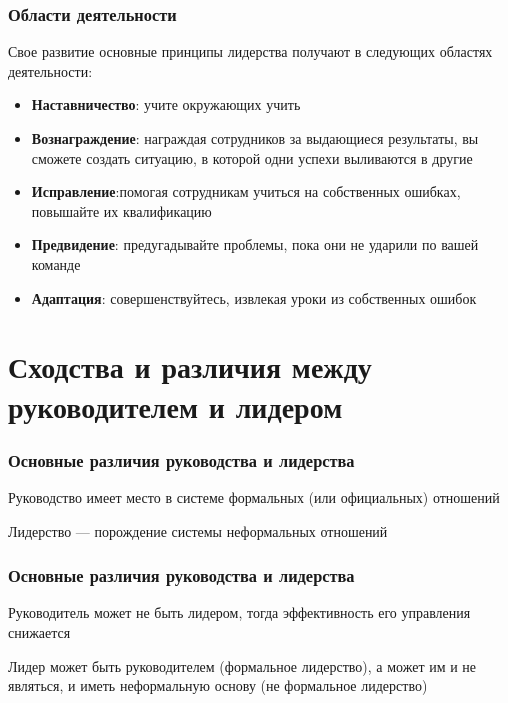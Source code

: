 \documentclass{../industrial-development}
\begin{document}
\begin{frame} \frametitle {Области деятельности}

Свое развитие основные принципы лидерства получают в следующих областях деятельности:

\begin{itemize}
	\item \textbf{Наставничество}: учите окружающих учить
	\item \textbf{Вознаграждение}: награждая сотрудников за выдающиеся результаты, вы сможете создать ситуацию, в которой одни успехи выливаются в другие
	\item \textbf{Исправление}:помогая сотрудникам учиться на собственных ошибках, повышайте их квалификацию
	\item \textbf{Предвидение}: предугадывайте проблемы, пока они не ударили по вашей команде
	\item \textbf{Адаптация}: совершенствуйтесь, извлекая уроки из собственных ошибок
\end{itemize}
\end{frame}




  
  


\section{Сходства и различия между руководителем и лидером}

\begin{frame} \frametitle{Основные различия руководства и лидерства}
\begin{block}{}
Руководство имеет место в системе формальных (или официальных) отношений
\end{block}

\begin{block}{}
Лидерство --- порождение системы неформальных отношений
\end{block}

\end{frame}

\begin{frame} \frametitle{Основные различия руководства и лидерства}
\begin{block}{}
Руководитель может не быть лидером, тогда эффективность его управления снижается
\end{block}

\begin{block}{}
Лидер может быть руководителем (формальное лидерство), а может им и не являться, и иметь неформальную основу (не формальное лидерство)
\end{block}

\end{frame}
\end{document}
